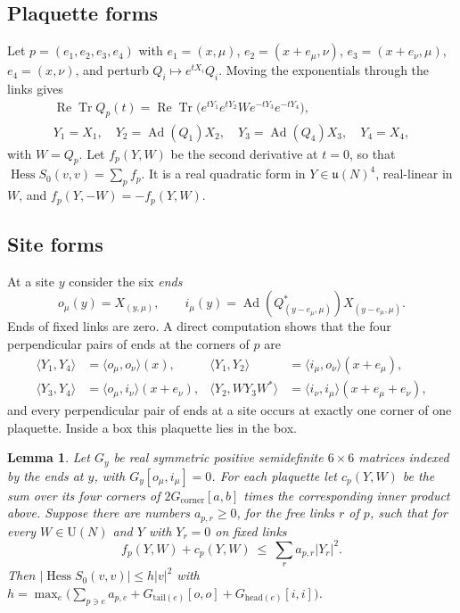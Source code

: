 \documentclass[11pt]{amsart}
\newtheorem{lemma}[theorem]{Lemma}
\theoremstyle{definition}
\theoremstyle{remark}
\newcommand{\Tr}{\operatorname{Tr}}
\renewcommand{\Re}{\operatorname{Re}}
\newcommand{\Hess}{\operatorname{Hess}}
\newcommand{\Ad}{\operatorname{Ad}}
\newcommand{\U}{\mathrm{U}}
\newcommand{\ip}[2]{\langle #1,#2\rangle}
\begin{document}
\subsection{Plaquette forms}
Let $p=(e_1,e_2,e_3,e_4)$ with $e_1=(x,\mu)$, $e_2=(x+e_\mu,\nu)$, $e_3=(x+e_\nu,\mu)$, $e_4=(x,\nu)$, and perturb
$Q_i\mapsto e^{tX_i}Q_i$. Moving the exponentials through the links gives
\begin{gather*}
\Re\Tr Q_p(t)=\Re\Tr\big(e^{tY_1}e^{tY_2}We^{-tY_3}e^{-tY_4}\big),\\
Y_1=X_1,\quad Y_2=\Ad(Q_1)X_2,\quad Y_3=\Ad(Q_4)X_3,\quad Y_4=X_4,
\end{gather*}
with $W=Q_p$. Let $f_p(Y,W)$ be the second derivative at $t=0$, so that $\Hess S_0(v,v)=\sum_pf_p$. It is a real
quadratic form in $Y\in\mathfrak u(N)^4$, real-linear in $W$, and $f_p(Y,-W)=-f_p(Y,W)$.

\subsection{Site forms}
At a site $y$ consider the six \emph{ends}
\[
o_\mu(y)=X_{(y,\mu)},\qquad i_\mu(y)=\Ad(Q^*_{(y-e_\mu,\mu)})X_{(y-e_\mu,\mu)}.
\]
Ends of fixed links are zero. A direct computation shows that the four perpendicular pairs of ends at the corners
of $p$ are
\begin{align*}
\ip{Y_1}{Y_4}&=\ip{o_\mu}{o_\nu}(x), & \ip{Y_1}{Y_2}&=\ip{i_\mu}{o_\nu}(x+e_\mu),\\
\ip{Y_3}{Y_4}&=\ip{o_\mu}{i_\nu}(x+e_\nu), & \ip{Y_2}{WY_3W^*}&=\ip{i_\nu}{i_\mu}(x+e_\mu+e_\nu),
\end{align*}
and every perpendicular pair of ends at a site occurs at exactly one corner of one plaquette. Inside a box this
plaquette lies in the box.

\begin{lemma}\label{lem:cert}
Let $G_y$ be real symmetric positive semidefinite $6\times6$ matrices indexed by the ends at $y$, with
$G_y[o_\mu,i_\mu]=0$. For each plaquette let $c_p(Y,W)$ be the sum over its four corners of $2G_{\mathrm{corner}}[a,b]$
times the corresponding inner product above. Suppose there are numbers $a_{p,r}\ge0$, for the free links $r$ of $p$,
such that for every $W\in\U(N)$ and $Y$ with $Y_r=0$ on fixed links
\begin{equation}\label{eq:plaq}
f_p(Y,W)+c_p(Y,W)\ \le\ \sum_ra_{p,r}|Y_r|^2 .
\end{equation}
Then $|\Hess S_0(v,v)|\le h|v|^2$ with $h=\max_e\big(\sum_{p\ni e}a_{p,e}+G_{\mathrm{tail}(e)}[o,o]+G_{\mathrm{head}(e)}[i,i]\big)$.
\end{lemma}
\end{document}
